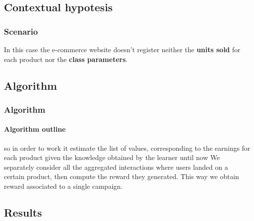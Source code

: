 
\subsection{Contextual hypotesis}


\begin{frame}

\frametitle{Scenario}

In this case the e-commerce website doesn't register neither the \textbf{units sold} for each product nor the \textbf{class parameters}.


\end{frame}


\subsection{Algorithm}


\begin{frame}

\frametitle{Algorithm}
\framesubtitle{Algorithm outline}

so in order to work it estimate the list of values, corresponding to the earnings for each product given the knowledge obtained by the learner until now
We separately consider all the aggregated interactions where users landed on a certain product, then compute the reward they generated.
This way we obtain reward associated to a single campaign.


\end{frame}


\subsection{Results}


